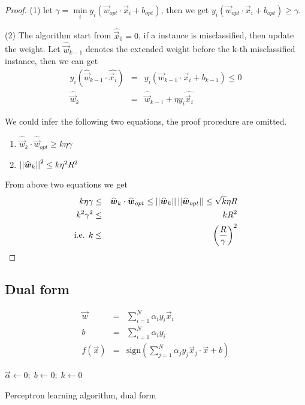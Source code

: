 \begin{proof}
(1) let $\gamma=\min\limits_{i} y_i(\vec{w}_{opt} \cdot \vec{x}_i+b_{opt})$, then we get $y_i(\vec{w}_{opt} \cdot \vec{x}_i+b_{opt}) \geq \gamma$.

(2) The algorithm start from $\widehat{\vec{x}}_0=0$, if a instance is misclassified, then update the weight. Let $\widehat{\vec{w}}_{k-1}$ denotes the extended weight before the k-th misclassified instance, then we can get
\begin{eqnarray}
y_i(\widehat{\vec{w}}_{k-1} \cdot \widehat{\vec{x}_i})&=&y_i(\vec{w}_{k-1} \cdot \vec{x}_i+b_{k-1}) \leq 0\\
\widehat{\vec{w}}_k&=&\widehat{\vec{w}}_{k-1}+\eta y_i \widehat{\vec{x}_i}
\end{eqnarray}

We could infer the following two equations, the proof procedure are omitted.
\begin{enumerate}
\item $\widehat{\vec{w}}_k \cdot \widehat{\vec{w}}_{opt} \geq k\eta\gamma$
\item $\abs{\abs{\widehat{\vec{w}}_k}}^2 \leq k\eta^2R^2$
\end{enumerate}

From above two equations we get
\begin{eqnarray}
\nonumber k\eta\gamma & \leq & \widehat{\vec{w}}_k \cdot \widehat{\vec{w}}_{opt} \leq \abs{\abs{\widehat{\vec{w}}_k}}\abs{\abs{\widehat{\vec{w}}_{opt}}} \leq \sqrt k \eta R \\
\nonumber k^2\gamma^2 & \leq & kR^2 \\
\nonumber \text{i.e. } k & \leq & \left(\dfrac{R}{\gamma}\right)^2
\end{eqnarray}
\end{proof}

\subsection{Dual form}
\begin{eqnarray}
\vec{w}&=&\sum\limits_{i=1}^{N} \alpha_iy_i\vec{x}_i \\
b&=&\sum\limits_{i=1}^{N} \alpha_iy_i \\
f(\vec{x})&=&\text{sign}\left(\sum\limits_{j=1}^{N} \alpha_jy_j\vec{x}_j \cdot \vec{x}+b\right)
\end{eqnarray}

\begin{algorithm}[htbp]
    \SetAlgoNoLine
  
    $\vec{\alpha} \leftarrow 0;\; b \leftarrow 0;\; k \leftarrow 0$\;
\caption{Perceptron learning algorithm, dual form}
\end{algorithm}